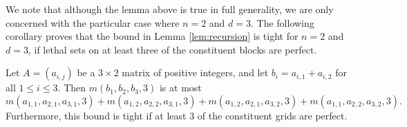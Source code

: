 We note that although the lemma above is true in full generality, we are only concerned with the particular case where $n=2$ and $d=3$. The following corollary proves that the bound in Lemma \ref{lem:recursion} is tight for $n=2$ and $d=3$, if lethal sets on at least three of the constituent blocks are perfect. 

\begin{cor}
\label{cor:recursion}
Let $A=(a_{i,j})$ be a $3 \times 2$ matrix of positive integers, and let $b_i = a_{i,1} + a_{i,2}$ for all $1 \leq i \leq 3$. Then $m(b_1, b_2, b_3, 3)$ is at most
$$m(a_{1,1}, a_{2,1}, a_{3,1}, 3) +  m(a_{1,2}, a_{2,2}, a_{3,1}, 3) + m(a_{1,2}, a_{2,1}, a_{3,2}, 3) + m(a_{1,1}, a_{2,2}, a_{3,2}, 3).$$
Furthermore, this bound is tight if at least 3 of the constituent grids are perfect. 
\end{cor}

